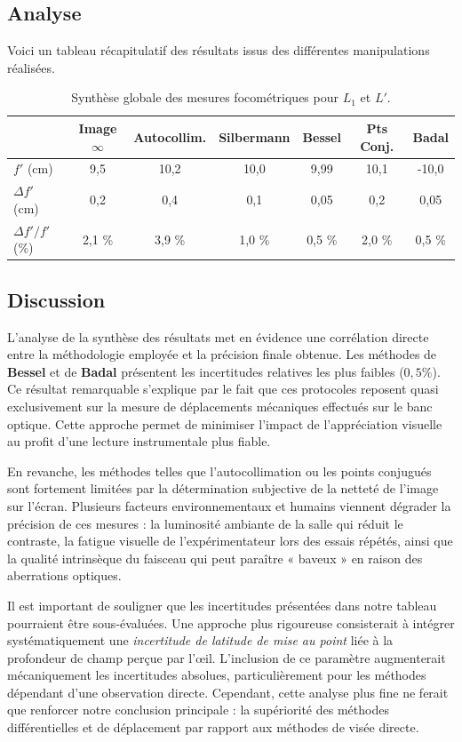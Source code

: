 \subsection{Analyse}

Voici un tableau récapitulatif des résultats issus des différentes 
manipulations réalisées. 

\begin{table}[h!]
    \centering
    \begin{tabular}{|l|c|c|c|c|c|c|}
        \hline
        & Image $\infty$ & Autocollim. & Silbermann & Bessel & Pts Conj. & Badal \\
        \hline
        $f'$ (cm) & 9,5 & 10,2 & 10,0 & 9,99 & 10,1 & -10,0 \\
        \hline
        $\Delta f'$ (cm) & 0,2 & 0,4 & 0,1 & 0,05 & 0,2 & 0,05 \\
        \hline
        $\Delta f' / f'$ (\%) & 2,1 \% & 3,9 \% & 1,0 \% & 0,5 \% & 2,0 \% & 0,5 \% \\
        \hline
    \end{tabular}
    \caption{Synthèse globale des mesures focométriques pour $L_1$ et $L'$.}
\end{table}

\subsection{Discussion}

L'analyse de la synthèse des résultats met en évidence une corrélation directe 
entre la méthodologie employée et la précision finale obtenue.
Les méthodes de \textbf{Bessel} et de \textbf{Badal} présentent 
les incertitudes relatives les plus faibles ($0,5\%$).
Ce résultat remarquable s'explique par le fait que ces protocoles 
reposent quasi exclusivement sur la mesure de déplacements mécaniques 
effectués sur le banc optique.
Cette approche permet de minimiser l'impact de l'appréciation visuelle 
au profit d'une lecture instrumentale plus fiable.

En revanche,
les méthodes telles que l'autocollimation ou les points conjugués 
sont fortement limitées par la détermination subjective 
de la netteté de l'image sur l'écran.
Plusieurs facteurs environnementaux et humains 
viennent dégrader la précision de ces mesures :
la luminosité ambiante de la salle qui réduit le contraste,
la fatigue visuelle de l'expérimentateur lors des essais répétés,
ainsi que la qualité intrinsèque du faisceau qui peut paraître « baveux » 
en raison des aberrations optiques.

Il est important de souligner que les incertitudes présentées 
dans notre tableau pourraient être sous-évaluées.
Une approche plus rigoureuse consisterait à intégrer systématiquement 
une \textit{incertitude de latitude de mise au point} 
liée à la profondeur de champ perçue par l'œil.
L'inclusion de ce paramètre augmenterait mécaniquement les incertitudes absolues,
particulièrement pour les méthodes dépendant d'une observation directe.
Cependant,
cette analyse plus fine ne ferait que renforcer notre conclusion principale :
la supériorité des méthodes différentielles et de déplacement 
par rapport aux méthodes de visée directe.